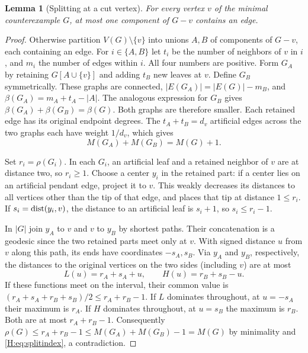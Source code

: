 \documentclass[11pt,a4paper]{article}
\newtheorem{lemma}[theorem]{Lemma}
\theoremstyle{remark}\newtheorem{remark}[theorem]{Remark}
\numberwithin{equation}{section}
\begin{document}
\begin{lemma}[Splitting at a cut vertex]\label{H:lem:split}
For every vertex $v$ of the minimal counterexample $G$, at most one
component of $G-v$ contains an edge.
\end{lemma}
\begin{proof}
Otherwise partition $V(G)\setminus\{v\}$ into unions $A,B$ of components
of $G-v$, each containing an edge. For $i\in\{A,B\}$ let $t_i$ be
the number of neighbors of $v$ in $i$, and $m_i$ the number of edges
within $i$. All four numbers are positive. Form $G_A$ by retaining
$G[A\cup\{v\}]$ and adding $t_B$ new leaves at $v$. Define $G_B$
symmetrically. These graphs are connected, $|E(G_A)|=|E(G)|-m_B$,
and $\beta(G_A)=m_A+t_A-|A|$. The analogous expression for $G_B$
gives $\beta(G_A)+\beta(G_B)=\beta(G)$. Both graphs are therefore
smaller. Each retained edge has its original endpoint degrees.
The $t_A+t_B=d_v$ artificial edges across the two graphs each have
weight $1/d_v$, which gives
\begin{equation}\label{H:eq:splitindex}
 M(G_A)+M(G_B)=M(G)+1 .
\end{equation}

Set $r_i=\rho(G_i)$. In each $G_i$, an artificial leaf and a retained
neighbor of $v$ are at distance two, so $r_i\ge1$. Choose a center
$y_i$ in the retained part: if a center lies on an artificial pendant
edge, project it to $v$. This weakly decreases its distances to all
vertices other than the tip of that edge, and places that tip at
distance $1\le r_i$. If $s_i=\operatorname{dist}(y_i,v)$, the distance to an
artificial leaf is $s_i+1$, so $s_i\le r_i-1$.

In $|G|$ join $y_A$ to $v$ and $v$ to $y_B$ by shortest paths. Their
concatenation is a geodesic since the two retained parts meet only at
$v$. With signed distance $u$ from $v$ along this path, its ends have
coordinates $-s_A,s_B$. Via $y_A$ and $y_B$, respectively, the
distances to the original vertices on the two sides (including $v$)
are at most
\[
 L(u)=r_A+s_A+u,\qquad H(u)=r_B+s_B-u .
\]
If these functions meet on the interval, their common value is
$(r_A+s_A+r_B+s_B)/2\le r_A+r_B-1$. If $L$ dominates throughout,
at $u=-s_A$ their maximum is $r_A$. If $H$ dominates throughout,
at $u=s_B$ the maximum is $r_B$. Both are at most $r_A+r_B-1$.
Consequently $\rho(G)\le r_A+r_B-1\le M(G_A)+M(G_B)-1=M(G)$ by
minimality and \eqref{H:eq:splitindex}, a contradiction.
\end{proof}
\end{document}
